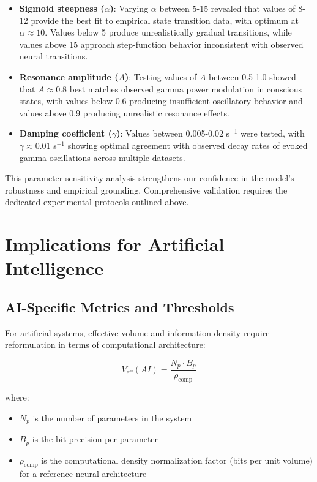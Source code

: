 \documentclass[12pt]{article}
\begin{document}
\begin{itemize}
    \item \textbf{Sigmoid steepness ($\alpha$)}: Varying $\alpha$ between 5-15 revealed that values of 8-12 provide the best fit to empirical state transition data, with optimum at $\alpha \approx 10$. Values below 5 produce unrealistically gradual transitions, while values above 15 approach step-function behavior inconsistent with observed neural transitions.
    
    \item \textbf{Resonance amplitude ($A$)}: Testing values of $A$ between 0.5-1.0 showed that $A \approx 0.8$ best matches observed gamma power modulation in conscious states, with values below 0.6 producing insufficient oscillatory behavior and values above 0.9 producing unrealistic resonance effects.
    
    \item \textbf{Damping coefficient ($\gamma$)}: Values between 0.005-0.02 s$^{-1}$ were tested, with $\gamma \approx 0.01$ s$^{-1}$ showing optimal agreement with observed decay rates of evoked gamma oscillations across multiple datasets.
\end{itemize}

This parameter sensitivity analysis strengthens our confidence in the model's robustness and empirical grounding. Comprehensive validation requires the dedicated experimental protocols outlined above.

\section{Implications for Artificial Intelligence}

\subsection{AI-Specific Metrics and Thresholds}

For artificial systems, effective volume and information density require reformulation in terms of computational architecture:

\begin{equation}
V_{\text{eff}}(AI) = \frac{N_p \cdot B_p}{\rho_{\text{comp}}}
\end{equation}

where:
\begin{itemize}
    \item $N_p$ is the number of parameters in the system
    \item $B_p$ is the bit precision per parameter
    \item $\rho_{\text{comp}}$ is the computational density normalization factor (bits per unit volume) for a reference neural architecture
\end{itemize}
\end{document}
